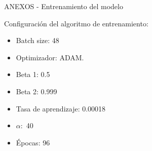\documentclass[12pt,aspectratio=169]{beamer}
\begin{document}
\begin{frame}{ANEXOS - Entrenamiento del modelo}

     Configuración del algoritmo de entrenamiento:
     \vspace{5mm}
     
     \begin{itemize}
        \item Batch size: 48
        \item Optimizador: ADAM.
        \item Beta 1: 0.5
        \item Beta 2: 0.999
        \item Tasa de aprendizaje: 0.00018
        \item $\alpha:$ 40
        \item Épocas: 96
    \end{itemize}
    
\end{frame}
\end{document}
